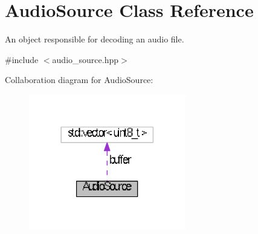 \hypertarget{classAudioSource}{\section{Audio\+Source Class Reference}
\label{classAudioSource}
}


An object responsible for decoding an audio file.  




{\ttfamily \#include $<$audio\+\_\+source.\+hpp$>$}



Collaboration diagram for Audio\+Source\+:
\nopagebreak
\begin{figure}[H]
\begin{center}
\leavevmode
\includegraphics[width=194pt]{classAudioSource__coll__graph}
\end{center}
\end{figure}
